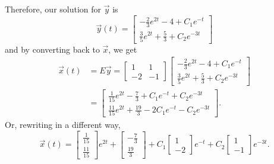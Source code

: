 \documentclass{ximera}
\begin{document}
\begin{exampleSol}
\begin{enumerate}
            Therefore, our solution for $\vec{y}$ is
            \begin{equation*}
                \vec{y}(t) = \begin{bmatrix} 
                    -\frac{2}{3}e^{2t} - 4 + C_1e^{-t}\\
                    \frac{3}{5}e^{2t} + \frac{5}{3} + C_2e^{-3t}
                \end{bmatrix}
            \end{equation*}
            and by converting back to $\vec{x}$, we get
            \begin{equation*} 
                \begin{split}
                    \vec{x}(t)  &= E\vec{y} = 
                    \begin{bmatrix} 
                        1 & 1 \\ 
                        -2 & -1 
                    \end{bmatrix}
                    \begin{bmatrix} 
                        -\frac{2}{3}e^{2t} - 4 + C_1e^{-t}\\
                        \frac{3}{5}e^{2t} + \frac{5}{3} + C_2e^{-3t}
                    \end{bmatrix} \\
                    &= \begin{bmatrix} 
                        \frac{1}{15}e^{2t} - \frac{7}{3} + C_1e^{-t} + C_2e^{-3t} \\
                        \frac{11}{15}e^{2t} + \frac{19}{3} - 2C_1e^{-t} - C_2e^{-3t} 
                    \end{bmatrix}.
                \end{split}
            \end{equation*}
            Or, rewriting in a different way,
            \begin{equation} \label{eq:AllExDiag}
                \vec{x}(t) = \begin{bmatrix} \frac{1}{15} \\  \frac{11}{15} \end{bmatrix} e^{2t} + \begin{bmatrix} -\frac{7}{3} \\ \frac{19}{3} \end{bmatrix} + C_1\begin{bmatrix} 1 \\ -2 \end{bmatrix} e^{-t} + C_2 \begin{bmatrix} 1 \\ -1 \end{bmatrix} e^{-3t}.

\end{equation}
\end{enumerate}
\end{exampleSol}
\end{document}
